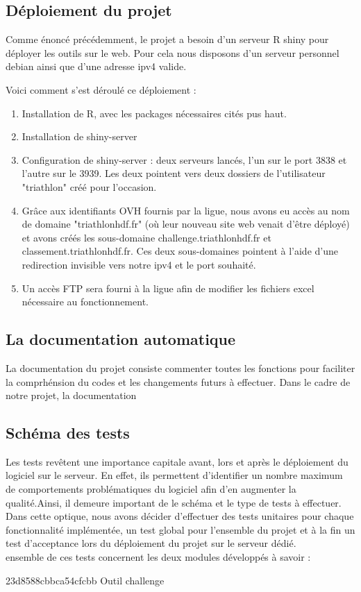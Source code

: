 \subsection {Déploiement du projet}

Comme énoncé précédemment, le projet a besoin d'un serveur R shiny pour déployer les outils sur le web.
Pour cela nous disposons d'un serveur personnel debian ainsi que d'une adresse ipv4 valide.

Voici comment s'est déroulé ce déploiement :

\begin{enumerate} 
	\item Installation de R, avec les packages nécessaires cités pus haut. \cite{ref2}
	\item Installation de shiny-server \cite{ref3}
	\item Configuration de shiny-server : deux serveurs lancés, l'un sur le port 3838 et l'autre sur le 3939. Les deux pointent vers deux dossiers de l'utilisateur "triathlon" créé pour l'occasion.
	\item Grâce aux identifiants OVH \cite{ref4} fournis par la ligue, nous avons eu accès au nom de domaine "triathlonhdf.fr" (où leur nouveau site web venait d'être déployé) et avons créés les sous-domaine challenge.triathlonhdf.fr et classement.triathlonhdf.fr. Ces deux sous-domaines pointent à l'aide d'une redirection invisible vers notre ipv4 et le port souhaité.
	\item Un accès FTP sera fourni à la ligue afin de modifier les fichiers excel nécessaire au fonctionnement.
\end{enumerate}


\subsection {La documentation automatique}
La documentation du projet consiste commenter toutes les fonctions pour faciliter la comprhénsion du codes et les changements futurs à effectuer.
Dans le cadre de notre projet,  la documentation  


\subsection {Schéma des tests}
Les tests revêtent une importance capitale avant, lors et après le déploiement du logiciel sur le serveur. En effet, ils permettent d'identifier un nombre maximum de comportements problématiques du logiciel afin d'en augmenter la qualité.Ainsi, il demeure important de  le schéma et le type de tests à effectuer. \\
Dans cette optique, nous avons décider d'effectuer des tests unitaires pour chaque fonctionnalité implémentée, un test global pour l'ensemble du projet et à la fin un test d'acceptance lors du déploiement du projet sur le serveur dédié.\\
                                                                                                                                                                                                                                                ensemble de ces tests concernent les deux modules développés à savoir :


23d8588cbbca54cfcbb
{Outil challenge}

